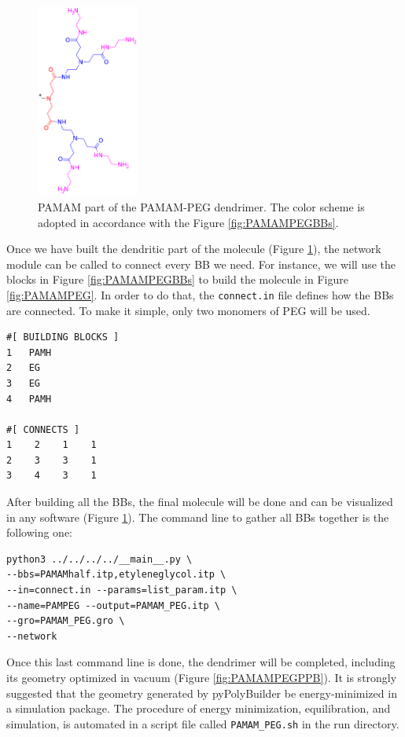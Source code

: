 \begin{figure}
    \centering
    \includegraphics[width=0.3\textwidth]{PAMAM_PEG/PAMAMPEGHalf.png}
    \caption{PAMAM part of the PAMAM-PEG dendrimer. The color scheme is adopted in accordance with the Figure \ref{fig:PAMAMPEGBBs}.}
    \label{fig:PAMAMPEGHalf}
\end{figure}

Once we have built the dendritic part of the molecule (Figure \ref{fig:PAMAMPEGHalf}), the network module can be called to connect every BB we need.
For instance, we will use the blocks in Figure \ref{fig:PAMAMPEGBBs} to build the molecule in Figure \ref{fig:PAMAMPEG}.
In order to do that, the \texttt{connect.in} file defines how the BBs are connected.
To make it simple, only two monomers of PEG will be used.

\begin{lstlisting}
#[ BUILDING BLOCKS ]
1   PAMH
2   EG
3   EG
4   PAMH

#[ CONNECTS ]
1    2    1    1
2    3    3    1
3    4    3    1

\end{lstlisting}

After building all the BBs, the final molecule will be done and can be visualized in any software (Figure \ref{fig:PAMAMPEGHalf}).
The command line to gather all BBs together is the following one:

\begin{lstlisting}
python3 ../../../../__main__.py \
--bbs=PAMAMhalf.itp,etyleneglycol.itp \
--in=connect.in --params=list_param.itp \
--name=PAMPEG --output=PAMAM_PEG.itp \
--gro=PAMAM_PEG.gro \
--network
\end{lstlisting}

Once this last command line is done, the dendrimer will be completed, including its geometry optimized in vacuum (Figure \ref{fig:PAMAMPEGPPB}).
It is strongly suggested that the geometry generated by pyPolyBuilder be energy-minimized in a simulation package.
The procedure of energy minimization, equilibration, and simulation, is automated in a script file called \texttt{PAMAM\_PEG.sh} in the run directory.

